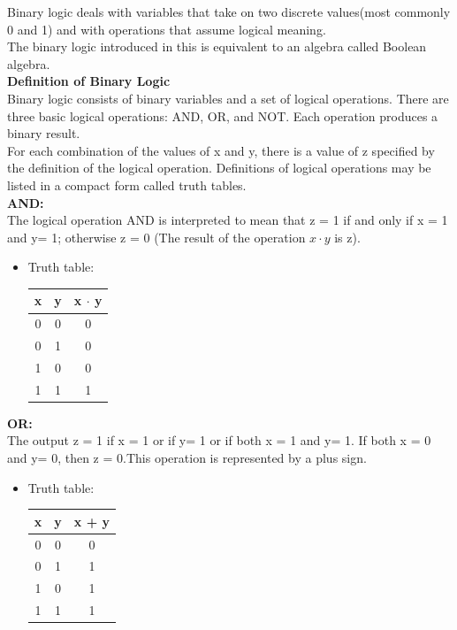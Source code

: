 \documentclass[a4paper,12pt]{article}
\begin{document}
Binary logic deals with variables that take on two discrete values(most commonly 0 and 1) and with operations that assume logical meaning.\\[10pt]
The binary logic introduced in this is equivalent to an algebra called Boolean algebra.\\[10pt]
\textbf{Definition of Binary Logic}\\
Binary logic consists of binary variables and a set of logical operations. There are three basic logical operations: AND, OR, and NOT. Each operation produces a binary result.\\[10pt ]
For each combination of the values of x and y, there is a value of z specified by the
definition of the logical operation. Definitions of logical operations may be listed in a
compact form called truth tables.\\[10pt]
\textbf{AND:}\\[10pt]The logical operation AND is interpreted to mean that z = 1 if and only if x = 1 and y= 1; otherwise z = 0 (The result of the operation $x\cdot y$ is z).
\begin{itemize}
        \item Truth table:
        \begin{tabular}{|c|c|c|}
        \hline
        x & y & x $\cdot$ y \\
        \hline
        0 & 0 & 0 \\
        \hline
        0 & 1 & 0 \\
        \hline
        1 & 0 & 0 \\
        \hline
        1 & 1 & 1 \\
        \hline
        \end{tabular}
\end{itemize}
\textbf{OR:}\\[10pt] The output z = 1 if x = 1 or if y= 1 or if both x = 1
and y= 1. If both x = 0 and y= 0, then z = 0.This operation is represented by a plus sign.\\
\begin{itemize}
        \item Truth table:
        \begin{tabular}{|c|c|c|}
        \hline
        x & y & x + y \\
        \hline
        0 & 0 & 0 \\
        \hline
        0 & 1 & 1 \\
        \hline
        1 & 0 & 1 \\
        \hline
        1 & 1 & 1 \\
        \hline
        \end{tabular}
\end{itemize}
\end{document}
